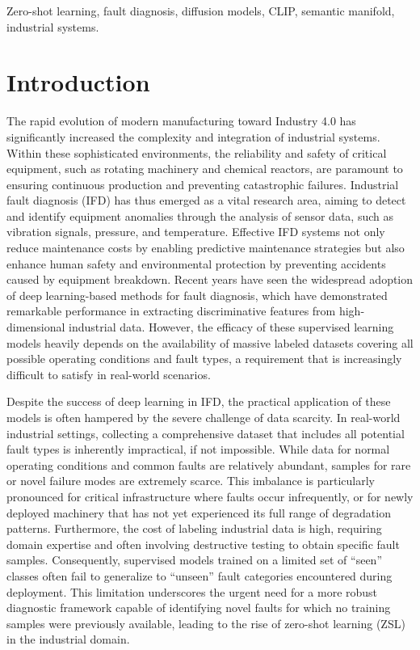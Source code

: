 \documentclass[journal]{IEEEtran}
\begin{document}
\begin{IEEEkeywords}
Zero-shot learning, fault diagnosis, diffusion models, CLIP, semantic manifold, industrial systems.
\end{IEEEkeywords}

\section{Introduction}
\label{sec:intro}

The rapid evolution of modern manufacturing toward Industry 4.0 has significantly increased the complexity and integration of industrial systems. Within these sophisticated environments, the reliability and safety of critical equipment, such as rotating machinery and chemical reactors, are paramount to ensuring continuous production and preventing catastrophic failures. Industrial fault diagnosis (IFD) has thus emerged as a vital research area, aiming to detect and identify equipment anomalies through the analysis of sensor data, such as vibration signals, pressure, and temperature. Effective IFD systems not only reduce maintenance costs by enabling predictive maintenance strategies but also enhance human safety and environmental protection by preventing accidents caused by equipment breakdown. Recent years have seen the widespread adoption of deep learning-based methods for fault diagnosis, which have demonstrated remarkable performance in extracting discriminative features from high-dimensional industrial data. However, the efficacy of these supervised learning models heavily depends on the availability of massive labeled datasets covering all possible operating conditions and fault types, a requirement that is increasingly difficult to satisfy in real-world scenarios.

Despite the success of deep learning in IFD, the practical application of these models is often hampered by the severe challenge of data scarcity. In real-world industrial settings, collecting a comprehensive dataset that includes all potential fault types is inherently impractical, if not impossible. While data for normal operating conditions and common faults are relatively abundant, samples for rare or novel failure modes are extremely scarce. This imbalance is particularly pronounced for critical infrastructure where faults occur infrequently, or for newly deployed machinery that has not yet experienced its full range of degradation patterns. Furthermore, the cost of labeling industrial data is high, requiring domain expertise and often involving destructive testing to obtain specific fault samples. Consequently, supervised models trained on a limited set of ``seen'' classes often fail to generalize to ``unseen'' fault categories encountered during deployment. This limitation underscores the urgent need for a more robust diagnostic framework capable of identifying novel faults for which no training samples were previously available, leading to the rise of zero-shot learning (ZSL) in the industrial domain.
\end{document}
